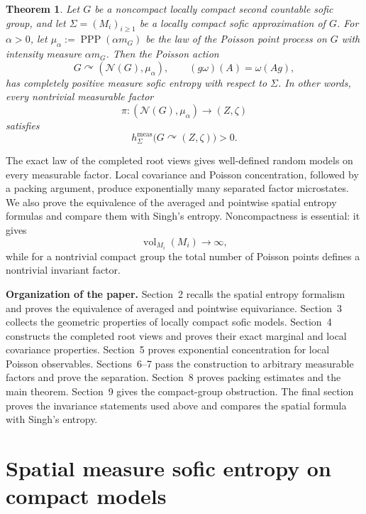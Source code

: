 \documentclass[12pt]{amsart}
\newtheorem{theorem}{Theorem}[section]
\theoremstyle{definition}
\newcommand{\Haar}{m_G}
\newcommand{\vol}{\operatorname{vol}}
\newcommand{\PPP}{\operatorname{PPP}}
\newcommand{\cN}{\mathcal N}
\newcommand{\1}{\mathbf 1}
\begin{document}
\begin{theorem}\label{thm:main}
Let $G$ be a noncompact locally compact second countable sofic group, and
let $\Sigma=(M_i)_{i\geq1}$ be a locally compact sofic approximation of
$G$. For $\alpha>0$, let $\mu_\alpha:=\PPP(\alpha\Haar)$
be the law of the Poisson point process on $G$ with intensity measure
$\alpha\Haar$. Then the Poisson action
	\[
	G\curvearrowright(\cN(G),\mu_\alpha),
	\qquad
	(g\omega)(A)=\omega(Ag),
	\]
	has completely positive measure sofic entropy with respect to $\Sigma$.
	In other words, every nontrivial measurable factor
	\[
	\pi:(\cN(G),\mu_\alpha)\longrightarrow(Z,\zeta)
	\]
	satisfies
	\[
	h^{\mathrm{meas}}_\Sigma
	\bigl(G\curvearrowright(Z,\zeta)\bigr)>0.
	\]
\end{theorem}

The exact law of the completed root views gives well-defined random models
on every measurable factor. Local covariance and Poisson concentration,
followed by a packing argument, produce exponentially many separated factor
microstates. We also prove the equivalence of the averaged and pointwise
spatial entropy formulas and compare them with Singh's entropy.
Noncompactness is essential: it gives
\[
\vol_{M_i}(M_i)\longrightarrow\infty,
\]
while for a nontrivial compact group the total number of Poisson points
defines a nontrivial invariant factor.

\medskip
\noindent\textbf{Organization of the paper.}
Section~2 recalls the spatial entropy formalism and proves the equivalence of
averaged and pointwise equivariance. Section~3 collects the geometric
properties of locally compact sofic models. Section~4 constructs the completed
root views and proves their exact marginal and local covariance properties.
Section~5 proves exponential concentration for local Poisson observables.
Sections~6--7 pass the construction to arbitrary measurable factors and prove
the separation. Section~8 proves  packing estimates and  the main theorem.
Section~9 gives the compact-group obstruction. The final section proves the
invariance statements used above and compares the spatial formula with Singh's
entropy.


\section{Spatial measure sofic entropy on compact models}\label{sec:compact-entropy}
\end{document}
